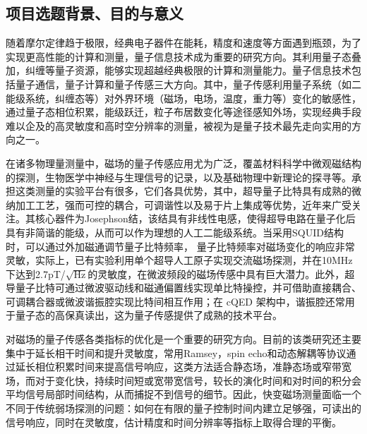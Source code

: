 \documentclass[a4paper,12pt]{article}
\begin{document}
\subsection{项目选题背景、目的与意义}

随着摩尔定律趋于极限，经典电子器件在能耗，精度和速度等方面遇到瓶颈，为了实现更高性能的计算和测量，量子信息技术成为重要的研究方向。其利用量子态叠加，纠缠等量子资源，能够实现超越经典极限的计算和测量能力。量子信息技术包括量子通信，量子计算和量子传感三大方向\citet{bennett2000quantum}。其中，量子传感利用量子系统（如二能级系统，纠缠态等）对外界环境（磁场，电场，温度，重力等）变化的敏感性，通过量子态相位积累，能级跃迁，粒子布居数变化等途径感知外场，实现经典手段难以企及的高灵敏度和高时空分辨率的测量，被视为是量子技术最先走向实用的方向之一\citet{degen2017quantum}。
\par 在诸多物理量测量中，磁场的量子传感应用尤为广泛，覆盖材料科学中微观磁结构的探测，生物医学中神经与生理信号的记录，以及基础物理中新理论的探寻等。承担这类测量的实验平台有很多，它们各具优势，其中，超导量子比特具有成熟的微纳加工工艺，强而可控的耦合，可调谐性以及易于片上集成等优势，近年来广受关注\citet{krantz2019quantum}\citet{degen2017quantum}。其核心器件为Josephson结，该结具有非线性电感，使得超导电路在量子化后具有非简谐的能级，从而可以作为理想的人工二能级系统。当采用SQUID结构时，可以通过外加磁通调节量子比特频率，
量子比特频率对磁场变化的响应非常灵敏\citet{blais2021circuit}，实际上，已有实验利用单个超导人工原子实现交流磁场探测，并在10MHz下达到2.7pT/$\sqrt{\text{Hz}}$的灵敏度\citet{bal2012ultrasensitive}，在微波频段的磁场传感中具有巨大潜力。此外，超导量子比特可通过微波驱动线和磁通偏置线实现单比特操控，并可借助直接耦合、可调耦合器或微波谐振腔实现比特间相互作用；在 cQED 架构中，谐振腔还常用于量子态的高保真读出，这为量子传感提供了成熟的技术平台\citet{blais2021circuit}。

\par 对磁场的量子传感各类指标的优化是一个重要的研究方向。目前的该类研究还主要集中于延长相干时间和提升灵敏度，常用Ramsey，spin echo和动态解耦等协议通过延长相位积累时间来提高信号响应\citet{degen2017quantum}，这类方法适合静态场，准静态场或窄带宽场，而对于变化快，持续时间短或宽带宽信号，较长的演化时间和对时间的积分会平均信号局部时间结构，从而捕捉不到信号的细节。因此，快变磁场测量面临一个不同于传统弱场探测的问题：如何在有限的量子控制时间内建立足够强，可读出的信号响应，同时在灵敏度，估计精度和时间分辨率等指标上取得合理的平衡。
\end{document}
